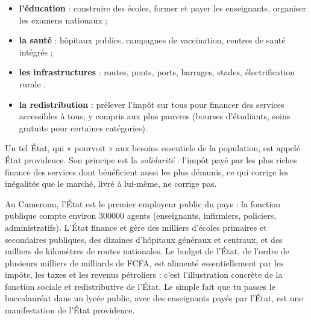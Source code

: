 \documentclass[11pt]{article}
\newcommand{\cle}[1]{{\popxbold\color{popdark}#1}}
\begin{document}
\begin{itemize}
\item \textbf{l'éducation} : construire des écoles, former et payer les enseignants, organiser les examens nationaux ;
\item \textbf{la santé} : hôpitaux publics, campagnes de vaccination, centres de santé intégrés ;
\item \textbf{les infrastructures} : routes, ponts, ports, barrages, stades, électrification rurale ;
\item \textbf{la redistribution} : prélever l'impôt sur tous pour financer des services accessibles à tous, y compris aux plus pauvres (bourses d'étudiants, soins gratuits pour certaines catégories).
\end{itemize}

Un tel État, qui « pourvoit » aux besoins essentiels de la population, est appelé \cle{État providence}. Son principe est la \emph{solidarité} : l'impôt payé par les plus riches finance des services dont bénéficient aussi les plus démunis, ce qui corrige les inégalités que le marché, livré à lui-même, ne corrige pas.

\begin{exemplebox}
Au Cameroun, l'État est le premier employeur public du pays : la fonction publique compte environ \num{300000} agents (enseignants, infirmiers, policiers, administratifs). L'État finance et gère des milliers d'écoles primaires et secondaires publiques, des dizaines d'hôpitaux généraux et centraux, et des milliers de kilomètres de routes nationales. Le budget de l'État, de l'ordre de plusieurs milliers de milliards de FCFA, est alimenté essentiellement par les impôts, les taxes et les revenus pétroliers : c'est l'illustration concrète de la fonction sociale et redistributive de l'État. Le simple fait que tu passes le baccalauréat dans un lycée public, avec des enseignants payés par l'État, est une manifestation de l'État providence.
\end{exemplebox}
\end{document}

